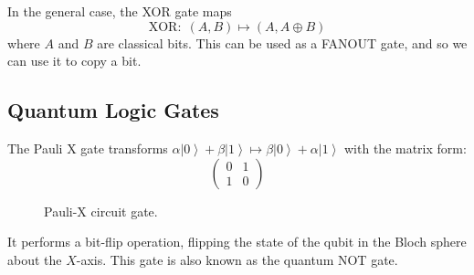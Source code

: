 \documentclass{article}
\newcommand{\ket}[1]{\ensuremath{\left|#1\right\rangle}}
\begin{document}
    \begin{definition}
      In the general case, the XOR gate maps
      \begin{equation} 
        \text{XOR}: \; (A, B) \mapsto (A, A \oplus B)
      \end{equation}
      where $A$ and $B$ are classical bits. This can be used as a FANOUT gate, and so we can use it to copy a bit. 
    \end{definition}

  \subsection{Quantum Logic Gates}

    \begin{definition}[Pauli X]
      The Pauli X gate transforms $\alpha \ket{0} + \beta \ket{1} \mapsto \beta \ket{0} + \alpha \ket{1}$ with the matrix form: 
      \begin{equation} 
        \begin{pmatrix} 0 & 1 \\ 1 & 0 \end{pmatrix}
      \end{equation}
      \begin{figure}[H]
        \centering 
        \caption{Pauli-X circuit gate.} 
        \label{fig:paulix}
      \end{figure}
      It performs a bit-flip operation, flipping the state of the qubit in the Bloch sphere about the $X$-axis. This gate is also known as the quantum NOT gate.
    \end{definition}
\end{document}
